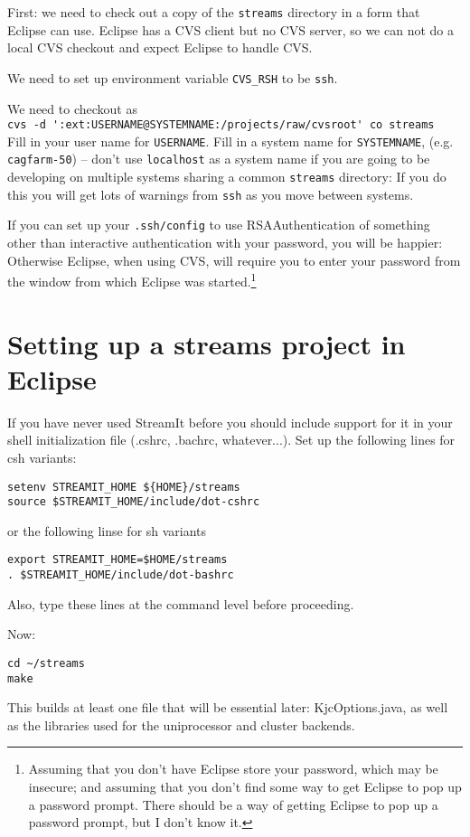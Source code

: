 \documentclass[11pt]{article}
\begin{document}
First: we need to check out a copy of the {\tt streams} directory in a
form that Eclipse can use.
Eclipse has a CVS client but no CVS server, so we can not do a local
CVS checkout and expect Eclipse to handle CVS.

We need to set up environment variable {\tt CVS\_RSH} to be {\tt ssh}.

We need to checkout as\\
\verb+cvs -d ':ext:USERNAME@SYSTEMNAME:/projects/raw/cvsroot' co streams+\\
Fill in your user name for {\tt USERNAME}.  
Fill in a system name for {\tt SYSTEMNAME}, (e.g. {\tt cagfarm-50}) -- don't use {\tt  localhost}
as a system name if you are going to be developing on multiple systems
sharing a common {\tt streams} directory: If you do this you will get lots
of warnings from {\tt ssh} as you move between systems.

If you can set up your {\tt .ssh/config} to use RSAAuthentication of
something other than interactive authentication with your password,
you will be happier:  Otherwise Eclipse, when using CVS, will require
you to enter your password from the window from which Eclipse was
started.\footnote{Assuming that you don't have Eclipse store your
  password, which may be insecure; and assuming that you don't find
  some way to get Eclipse to pop up a password prompt.  There should
  be a way of getting Eclipse to pop up a password prompt, but I don't
know it.}

\section{Setting up a streams project in Eclipse}

If you have never used StreamIt before you should include support for
it in your shell initialization file (.cshrc, .bachrc, whatever...).
Set up the following lines for csh variants:
\begin{verbatim}
setenv STREAMIT_HOME ${HOME}/streams
source $STREAMIT_HOME/include/dot-cshrc
\end{verbatim}
or the following linse for sh variants
\begin{verbatim}
export STREAMIT_HOME=$HOME/streams
. $STREAMIT_HOME/include/dot-bashrc
\end{verbatim}
Also, type these lines at the command level before proceeding.

Now:
\begin{verbatim}
cd ~/streams
make
\end{verbatim}
This builds at least one file that will be essential later: KjcOptions.java,
as well as the libraries used for the uniprocessor and cluster
backends.
\end{document}
